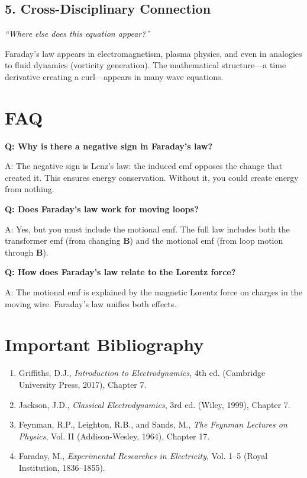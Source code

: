\subsection*{5. Cross-Disciplinary Connection}
\textit{``Where else does this equation appear?''}

Faraday's law appears in electromagnetism, plasma physics, and even in analogies to fluid dynamics (vorticity generation). The mathematical structure---a time derivative creating a curl---appears in many wave equations.

\section*{FAQ}

\textbf{Q: Why is there a negative sign in Faraday's law?}

A: The negative sign is Lenz's law: the induced emf opposes the change that created it. This ensures energy conservation. Without it, you could create energy from nothing.

\textbf{Q: Does Faraday's law work for moving loops?}

A: Yes, but you must include the motional emf. The full law includes both the transformer emf (from changing $\mathbf{B}$) and the motional emf (from loop motion through $\mathbf{B}$).

\textbf{Q: How does Faraday's law relate to the Lorentz force?}

A: The motional emf is explained by the magnetic Lorentz force on charges in the moving wire. Faraday's law unifies both effects.

\section*{Important Bibliography}

\begin{enumerate}
\item Griffiths, D.J., \textit{Introduction to Electrodynamics}, 4th ed. (Cambridge University Press, 2017), Chapter 7.
\item Jackson, J.D., \textit{Classical Electrodynamics}, 3rd ed. (Wiley, 1999), Chapter 7.
\item Feynman, R.P., Leighton, R.B., and Sands, M., \textit{The Feynman Lectures on Physics}, Vol. II (Addison-Wesley, 1964), Chapter 17.
\item Faraday, M., \textit{Experimental Researches in Electricity}, Vol. 1--5 (Royal Institution, 1836--1855).
\end{enumerate}

